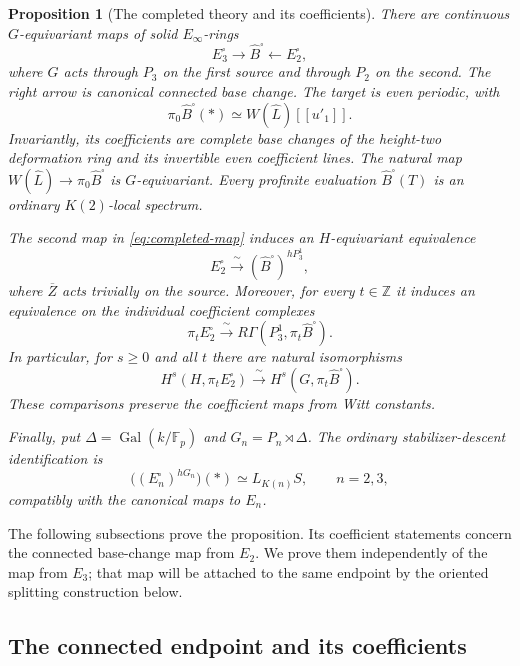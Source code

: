 \documentclass[11pt]{article}
\numberwithin{equation}{section}
\newtheorem{proposition}[theorem]{Proposition}
\theoremstyle{definition}
\theoremstyle{remark}
\newcommand{\Z}{\mathbb Z}
\newcommand{\F}{\mathbb F}
\DeclareMathOperator{\Gal}{Gal}
\begin{document}
\begin{proposition}[The completed theory and its coefficients]
\label{prop:completed-theory}
There are continuous $G$-equivariant maps of solid $E_\infty$-rings
\begin{equation}\label{eq:completed-map}
 E_3^{\square}\longrightarrow\widehat B^{\square}
       \longleftarrow E_2^{\square},
\end{equation}
where $G$ acts through $P_3$ on the first source and through $P_2$ on
the second. The right arrow is canonical connected base change.
The target is even periodic, with
\[
 \pi_0\widehat B^{\square}(*)\simeq W(\widehat L)[[u'_1]].
\]
Invariantly, its coefficients are complete base changes of the
height-two deformation ring and its invertible even coefficient lines.
The natural map $W(\widehat L)\to\pi_0\widehat B^{\square}$ is
$G$-equivariant.  Every profinite evaluation
$\widehat B^{\square}(T)$ is an ordinary $K(2)$-local spectrum.

The second map in \eqref{eq:completed-map} induces an $H$-equivariant
equivalence
\[
 E_2^{\square}\xrightarrow{\ \sim\ }
       (\widehat B^{\square})^{hP_3^1},
\]
where $\overline Z$ acts trivially on the source.  Moreover, for every
$t\in\Z$ it induces an equivalence on the individual coefficient
complexes
\[
 \pi_tE_2^{\square}\xrightarrow{\ \sim\ }
       R\Gamma(P_3^1,\pi_t\widehat B^{\square}).
\]
In particular, for $s\ge0$ and all $t$ there are natural isomorphisms
\begin{equation}\label{eq:coefficient-descent}
 H^s(H,\pi_tE_2^{\square})
       \xrightarrow{\ \sim\ }
 H^s(G,\pi_t\widehat B^{\square}).
\end{equation}
These comparisons preserve the coefficient maps from Witt constants.

Finally, put $\Delta=\Gal(k/\F_p)$ and
$G_n=P_n\rtimes\Delta$.  The ordinary stabilizer-descent identification
is
\[
 \bigl((E_n^{\square})^{hG_n}\bigr)(*)\simeq L_{K(n)}S,
 \qquad n=2,3,
\]
compatibly with the canonical maps to $E_n$.
\end{proposition}

The following subsections prove the proposition. Its coefficient
statements concern the connected
base-change map from \(E_2\). We prove them independently of the map
from \(E_3\); that map will be attached to the same endpoint by the
oriented splitting construction below.

\subsection{The connected endpoint and its coefficients}
\end{document}
